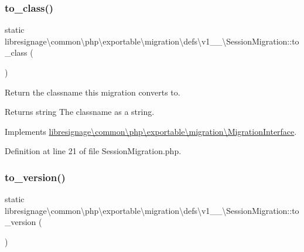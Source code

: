 \subsubsection{\texorpdfstring{to\+\_\+class()}{to\_class()}}
{\footnotesize\ttfamily static libresignage\textbackslash{}common\textbackslash{}php\textbackslash{}exportable\textbackslash{}migration\textbackslash{}defs\textbackslash{}v1\+\_\+\_\textbackslash{}\+Session\+Migration\+::to\+\_\+class (\begin{DoxyParamCaption}{ }\end{DoxyParamCaption})\hspace{0.3cm}{\ttfamily [static]}}

Return the classname this migration converts to.

\begin{DoxyReturn}{Returns}
string The classname as a string. 
\end{DoxyReturn}


Implements \hyperlink{interfacelibresignage_1_1common_1_1php_1_1exportable_1_1migration_1_1MigrationInterface_ab1f33cdd8684595d6b000bcbc7c4d5a4}{libresignage\textbackslash{}common\textbackslash{}php\textbackslash{}exportable\textbackslash{}migration\textbackslash{}\+Migration\+Interface}.



Definition at line 21 of file Session\+Migration.\+php.

\mbox{\label{classlibresignage_1_1common_1_1php_1_1exportable_1_1migration_1_1defs_1_1v1__0__0_1_1SessionMigration_ae550884b97a5fa9dff765005859d69ac}} 
\subsubsection{\texorpdfstring{to\+\_\+version()}{to\_version()}}
{\footnotesize\ttfamily static libresignage\textbackslash{}common\textbackslash{}php\textbackslash{}exportable\textbackslash{}migration\textbackslash{}defs\textbackslash{}v1\+\_\+\_\textbackslash{}\+Session\+Migration\+::to\+\_\+version (\begin{DoxyParamCaption}{ }\end{DoxyParamCaption})\hspace{0.3cm}{\ttfamily [static]}}

